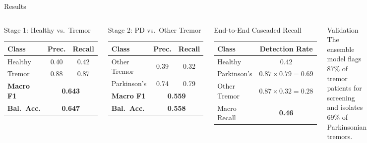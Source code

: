 \documentclass[aspectratio=169, 11pt]{beamer}
\begin{document}
\begin{frame}{Results}
  \begin{columns}[T]
      \begin{block}{Stage 1: Healthy vs.\ Tremor}
        \footnotesize
        \begin{tabular}{lcc}
          \toprule
          Class & Prec. & Recall \\
          \midrule
          Healthy & 0.40 & 0.42 \\
          Tremor  & 0.88 & 0.87 \\
          \midrule
          \textbf{Macro F1} & \multicolumn{2}{c}{\textbf{0.643}} \\
          \textbf{Bal.\ Acc.} & \multicolumn{2}{c}{\textbf{0.647}} \\
          \bottomrule
        \end{tabular}
      \end{block}
      \vspace{0.1em}
      \begin{block}{Stage 2: PD vs.\ Other Tremor}
        \footnotesize
        \begin{tabular}{lcc}
          \toprule
          Class & Prec. & Recall \\
          \midrule
          Other Tremor & 0.39 & 0.32 \\
          Parkinson's  & 0.74 & 0.79 \\
          \midrule
          \textbf{Macro F1} & \multicolumn{2}{c}{\textbf{0.559}} \\
          \textbf{Bal.\ Acc.} & \multicolumn{2}{c}{\textbf{0.558}} \\
          \bottomrule
        \end{tabular}
      \end{block}
      \begin{alertblock}{End-to-End Cascaded Recall}
        \footnotesize
        \begin{tabular}{lc}
          \toprule
          Class & Detection Rate \\
          \midrule
          Healthy & 0.42 \\
          Parkinson's & $0.87 \times 0.79 = \mathbf{0.69}$ \\
          Other Tremor & $0.87 \times 0.32 = 0.28$ \\
          \midrule
          Macro Recall & \textbf{0.46} \\
          \bottomrule
        \end{tabular}
      \end{alertblock}
      \vspace{0.1em}
      \begin{exampleblock}{Validation}
        \footnotesize
        The ensemble model flags 87\% of tremor patients for screening
        and isolates 69\% of Parkinsonian tremors.
      \end{exampleblock}
    \end{columns}
\end{frame}
\end{document}
